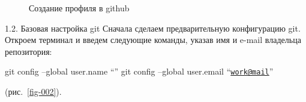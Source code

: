 \documentclass[
  english,
  russian,
  12pt,
  a4paper,
  DIV=11,
  numbers=noendperiod]{scrreprt}
\begin{document}
\begin{figure}


\caption{\label{fig-001}Создание профиля в github}

\end{figure}%

1.2. Базовая настройка git Сначала сделаем предварительную конфигурацию
git. Откроем терминал и введем следующие команды, указав имя и e-mail
владельца репозитория:

git config --global user.name \enquote{} git config --global user.email
\enquote{\href{mailto:work@mail}{\nolinkurl{work@mail}}}

(рис.~\ref{fig-002}).
\end{document}
